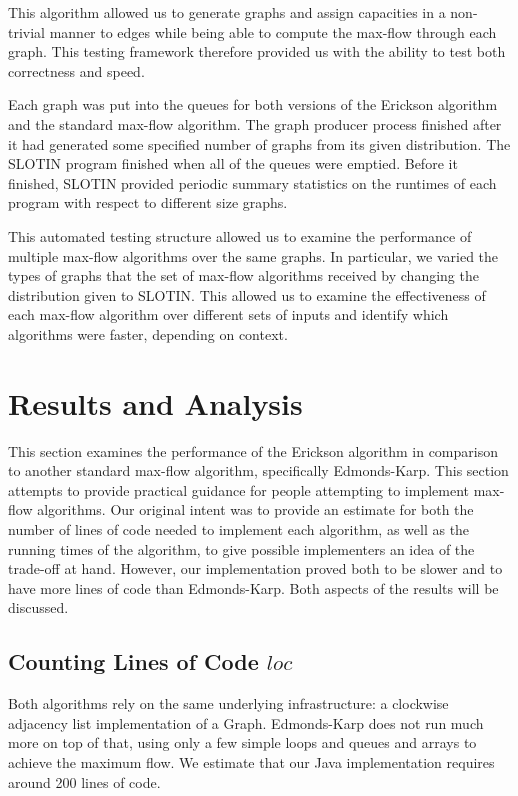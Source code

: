\documentclass[12pt]{article}
\begin{document}
This algorithm allowed us to generate graphs and assign capacities in a non-trivial manner to edges while being able to compute the max-flow through each graph. This testing framework therefore provided us with the ability to test both correctness and speed.

Each graph was put into the queues for both versions of the Erickson algorithm and the standard max-flow algorithm. The graph producer process finished after it had generated some specified number of graphs from its given distribution. The SLOTIN program finished when all of the queues were emptied. Before it finished, SLOTIN provided periodic summary statistics on the runtimes of each program with respect to different size graphs. 

This automated testing structure allowed us to examine the performance of multiple max-flow algorithms over the same graphs. In particular, we varied the types of graphs that the set of max-flow algorithms received by changing the distribution given to SLOTIN. This allowed us to examine the effectiveness of each max-flow algorithm over different sets of inputs and identify which algorithms were faster, depending on context. 

\section{Results and Analysis}

This section examines the performance of the Erickson algorithm in comparison to another standard max-flow algorithm, specifically Edmonds-Karp. This section attempts to provide practical guidance for people attempting to implement max-flow algorithms.  Our original intent was to provide an estimate for both the number of lines of code needed to implement each algorithm, as well as the running times of the algorithm, to give possible implementers an idea of the trade-off at hand.  However, our implementation proved both to be slower and to have more lines of code than Edmonds-Karp.  Both aspects of the results will be discussed.

\subsection{Counting Lines of Code $loc$}

Both algorithms rely on the same underlying infrastructure: a clockwise adjacency list implementation of a Graph.  Edmonds-Karp does not run much more on top of that, using only a few simple loops and queues and arrays to achieve the maximum flow.  We estimate that our Java implementation requires around 200 lines of code.
\end{document}
